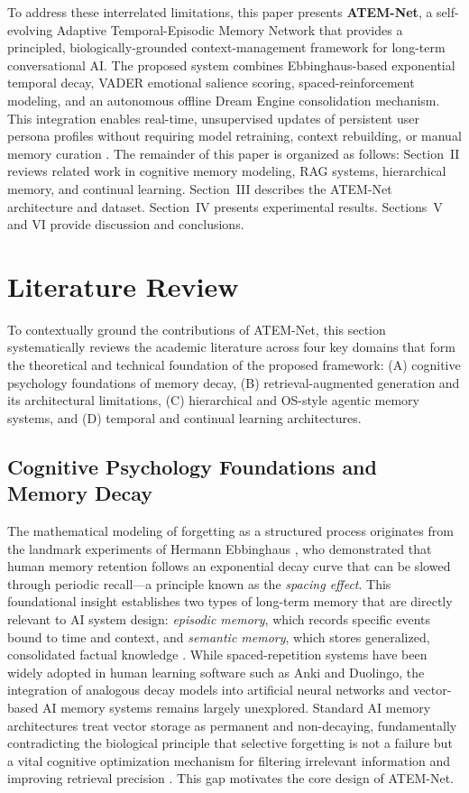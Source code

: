 \documentclass[conference]{IEEEtran}
\begin{document}
To address these interrelated limitations, this paper presents \textbf{ATEM-Net}, a self-evolving Adaptive Temporal-Episodic Memory Network that provides a principled, biologically-grounded context-management framework for long-term conversational AI. The proposed system combines Ebbinghaus-based exponential temporal decay, VADER emotional salience scoring, spaced-reinforcement modeling, and an autonomous offline Dream Engine consolidation mechanism. This integration enables real-time, unsupervised updates of persistent user persona profiles without requiring model retraining, context rebuilding, or manual memory curation \cite{packer}. The remainder of this paper is organized as follows: Section~II reviews related work in cognitive memory modeling, RAG systems, hierarchical memory, and continual learning. Section~III describes the ATEM-Net architecture and dataset. Section~IV presents experimental results. Sections~V and VI provide discussion and conclusions.

\section{Literature Review}

To contextually ground the contributions of ATEM-Net, this section systematically reviews the academic literature across four key domains that form the theoretical and technical foundation of the proposed framework: (A) cognitive psychology foundations of memory decay, (B) retrieval-augmented generation and its architectural limitations, (C) hierarchical and OS-style agentic memory systems, and (D) temporal and continual learning architectures.

\subsection{Cognitive Psychology Foundations and Memory Decay}

The mathematical modeling of forgetting as a structured process originates from the landmark experiments of Hermann Ebbinghaus \cite{ebbinghaus}, who demonstrated that human memory retention follows an exponential decay curve that can be slowed through periodic recall—a principle known as the \textit{spacing effect}. This foundational insight establishes two types of long-term memory that are directly relevant to AI system design: \textit{episodic memory}, which records specific events bound to time and context, and \textit{semantic memory}, which stores generalized, consolidated factual knowledge \cite{shi}. While spaced-repetition systems have been widely adopted in human learning software such as Anki and Duolingo, the integration of analogous decay models into artificial neural networks and vector-based AI memory systems remains largely unexplored. Standard AI memory architectures treat vector storage as permanent and non-decaying, fundamentally contradicting the biological principle that selective forgetting is not a failure but a vital cognitive optimization mechanism for filtering irrelevant information and improving retrieval precision \cite{thompson}. This gap motivates the core design of ATEM-Net.
\end{document}

